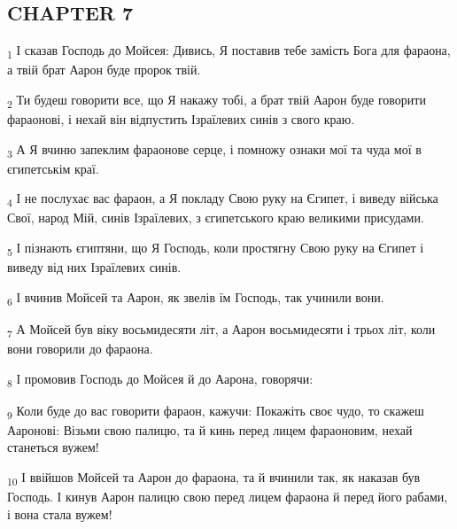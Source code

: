 \subsection{CHAPTER 7}
\begin{tcolorbox}
\textsubscript{1} І сказав Господь до Мойсея: Дивись, Я поставив тебе замість Бога для фараона, а твій брат Аарон буде пророк твій.
\end{tcolorbox}
\begin{tcolorbox}
\textsubscript{2} Ти будеш говорити все, що Я накажу тобі, а брат твій Аарон буде говорити фараонові, і нехай він відпустить Ізраїлевих синів з свого краю.
\end{tcolorbox}
\begin{tcolorbox}
\textsubscript{3} А Я вчиню запеклим фараонове серце, і помножу ознаки мої та чуда мої в єгипетськім краї.
\end{tcolorbox}
\begin{tcolorbox}
\textsubscript{4} І не послухає вас фараон, а Я покладу Свою руку на Єгипет, і виведу війська Свої, народ Мій, синів Ізраїлевих, з єгипетського краю великими присудами.
\end{tcolorbox}
\begin{tcolorbox}
\textsubscript{5} І пізнають єгиптяни, що Я Господь, коли простягну Свою руку на Єгипет і виведу від них Ізраїлевих синів.
\end{tcolorbox}
\begin{tcolorbox}
\textsubscript{6} І вчинив Мойсей та Аарон, як звелів їм Господь, так учинили вони.
\end{tcolorbox}
\begin{tcolorbox}
\textsubscript{7} А Мойсей був віку восьмидесяти літ, а Аарон восьмидесяти і трьох літ, коли вони говорили до фараона.
\end{tcolorbox}
\begin{tcolorbox}
\textsubscript{8} І промовив Господь до Мойсея й до Аарона, говорячи:
\end{tcolorbox}
\begin{tcolorbox}
\textsubscript{9} Коли буде до вас говорити фараон, кажучи: Покажіть своє чудо, то скажеш Ааронові: Візьми свою палицю, та й кинь перед лицем фараоновим, нехай станеться вужем!
\end{tcolorbox}
\begin{tcolorbox}
\textsubscript{10} І ввійшов Мойсей та Аарон до фараона, та й вчинили так, як наказав був Господь. І кинув Аарон палицю свою перед лицем фараона й перед його рабами, і вона стала вужем!
\end{tcolorbox}
